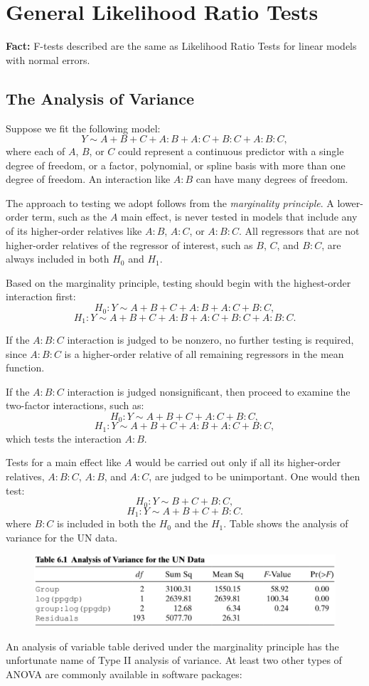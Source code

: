 \documentclass[14pt]{extarticle}
\begin{document}
\section*{General Likelihood Ratio Tests}

\textbf{Fact:} F-tests described are the same as Likelihood Ratio Tests for linear models with normal errors.

\subsection*{The Analysis of Variance}

Suppose we fit the following model:
\[
Y \sim A + B + C + A:B + A:C + B:C + A:B:C,
\]
where each of $A$, $B$, or $C$ could represent a continuous predictor with a single degree of freedom, or a factor, polynomial, or spline basis with more than one degree of freedom. An interaction like $A:B$ can have many degrees of freedom.

The approach to testing we adopt follows from the \textit{marginality principle}. A lower-order term, such as the $A$ main effect, is never tested in models that include any of its higher-order relatives like $A:B$, $A:C$, or $A:B:C$. All regressors that are not higher-order relatives of the regressor of interest, such as $B$, $C$, and $B:C$, are always included in both $H_0$ and $H_1$.

Based on the marginality principle, testing should begin with the highest-order interaction first:
\[
H_0: Y \sim A + B + C + A:B + A:C + B:C,
\]
\[
H_1: Y \sim A + B + C + A:B + A:C + B:C + A:B:C.
\]

If the $A:B:C$ interaction is judged to be nonzero, no further testing is required, since $A:B:C$ is a higher-order relative of all remaining regressors in the mean function.

If the $A:B:C$ interaction is judged nonsignificant, then proceed to examine the two-factor interactions, such as:
\[
H_0: Y \sim A + B + C + A:C + B:C,
\]
\[
H_1: Y \sim A + B + C + A:B + A:C + B:C,
\]
which tests the interaction $A:B$.

Tests for a main effect like $A$ would be carried out only if all its higher-order relatives, $A:B:C$, $A:B$, and $A:C$, are judged to be unimportant. One would then test:
\[
H_0: Y \sim B + C + B:C,
\]
\[
H_1: Y \sim A + B + C + B:C.
\]
where $B:C$ is included in both the $H_0$ and the $H_1$.  
Table shows the analysis of variance for the UN data.
\begin{figure}[H]
    \centering
    \includegraphics[width=1\textwidth]{fig3.png}
\end{figure}
An analysis of variable table derived under the marginality principle has the unfortunate name of Type II analysis of variance. At least two other types of ANOVA are commonly available in software packages:
\end{document}
